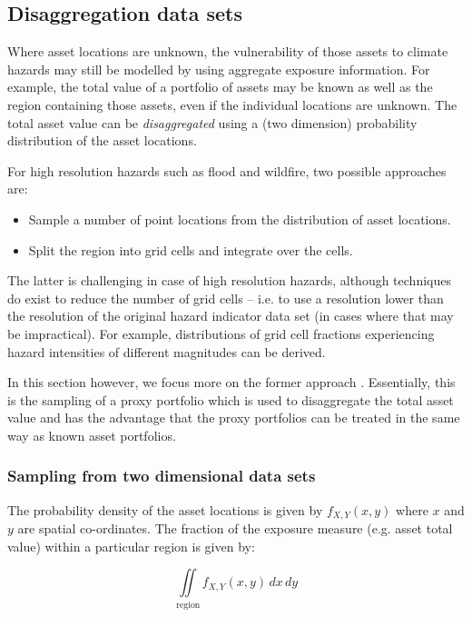 \documentclass[a4paper,11pt]{extarticle} %
\theoremstyle{definition}
\begin{document}
\subsection{Disaggregation data sets}

Where asset locations are unknown, the vulnerability of those assets to climate hazards may still be modelled by using aggregate exposure information. For example, the total value of a portfolio of assets may be known as well as the region containing those assets, even if the individual locations are unknown. The total asset value can be \emph{disaggregated} using  a (two dimension) probability distribution of the asset locations.

For high resolution hazards such as flood and wildfire, two possible approaches are:
\begin{itemize}
\item Sample a number of point locations from the distribution of asset locations.
\item Split the region into grid cells and integrate over the cells.
\end{itemize}

The latter is challenging in case of high resolution hazards, although techniques do exist to reduce the number of grid cells -- i.e. to use a resolution lower than the resolution of the original hazard indicator data set (in cases where that may be impractical). For example, distributions of grid cell fractions experiencing hazard intensities of different magnitudes can be derived.

In this section however, we focus more on the former approach . Essentially, this is the sampling of a proxy portfolio which is used to disaggregate the total asset value and has the advantage that the proxy portfolios can be treated in the same way as known asset portfolios.


\subsubsection{Sampling from two dimensional data sets}
The probability density of the asset locations is given by $f_{X, Y}(x, y)$ where $x$ and $y$ are spatial co-ordinates. The fraction of the exposure measure (e.g. asset total value) within a particular region is given by:

\begin{equation}
    \label{Eq:Disagg1}
    \iint\limits_{\mathrm{region}} f_{X, Y}(x, y) \, dx \, dy
\end{equation}
\end{document}
